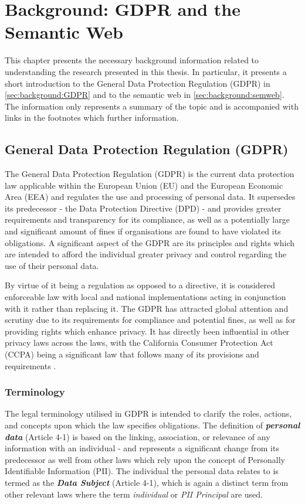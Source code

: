 \chapter{Background: GDPR and the Semantic Web}
\label{chapter:background}

This chapter presents the necessary background information related to understanding the research presented in this thesis. In particular, it presents a short introduction to the General Data Protection Regulation (GDPR) in \autoref{sec:background:GDPR} and to the semantic web in \autoref{sec:background:semweb}. The information only represents a summary of the topic and is accompanied with links in the footnotes which further information.

\section{General Data Protection Regulation (GDPR)}\label{sec:background:GDPR}
The General Data Protection Regulation (GDPR) \cite{Regulation_GDPR} is the current data protection law applicable within the European Union (EU) and the European Economic Area (EEA) and regulates the use and processing of personal data. 
It supersedes its predecessor - the Data Protection Directive (DPD) \cite{directive_DPD} - and provides greater requirements and transparency for its compliance, as well as a potentially large and significant amount of fines if organisations are found to have violated its obligations.
A significant aspect of the GDPR are its principles and rights which are intended to afford the individual greater privacy and control regarding the use of their personal data.

By virtue of it being a regulation as opposed to a directive, it is considered enforceable law with local and national implementations acting in conjunction with it rather than replacing it.
The GDPR has attracted global attention and scrutiny due to its requirements for compliance and potential fines, as well as for providing rights which enhance privacy.
It has directly been influential in other privacy laws across the laws, with the California Consumer Protection Act (CCPA) being a significant law that follows many of its provisions and requirements \cite{marini_gdpr_2018}.

\subsection{Terminology}
The legal terminology utilised in GDPR is intended to clarify the roles, actions, and concepts upon which the law specifies obligations.
The definition of \textit{\textbf{personal data}} (Article 4-1) is based on the linking, association, or relevance of any information with an individual - and represents a significant change from its predecessor as well from other laws which rely upon the concept of Personally Identifiable Information (PII). The individual the personal data relates to is termed as the \textit{\textbf{Data Subject}} (Article 4-1), which is again a distinct term from other relevant laws where the term \textit{individual} or \textit{PII Principal} are used.


